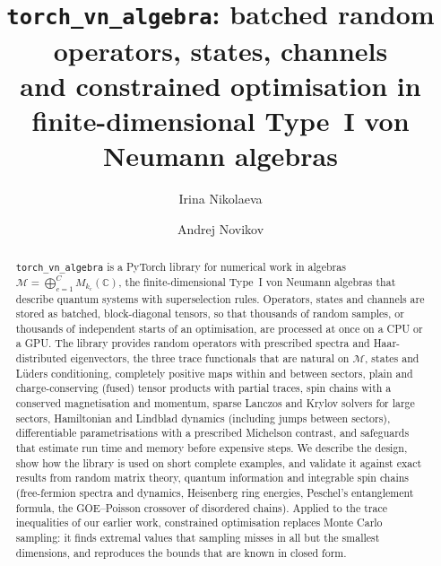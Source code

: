 \documentclass[11pt]{article}
\title{\texttt{torch\_vn\_algebra}: batched random operators, states, channels\\
and constrained optimisation in finite-dimensional Type~I von Neumann algebras}
\author{Irina Nikolaeva \and Andrej Novikov}
\date{}
\newcommand{\C}{\mathbb{C}}
\newcommand{\M}{\mathcal{M}}
\begin{document}
\maketitle

\begin{abstract}
\texttt{torch\_vn\_algebra} is a PyTorch library for numerical work in algebras
$\M=\bigoplus_{c=1}^C M_{k_c}(\C)$, the finite-dimensional Type~I von Neumann algebras that describe
quantum systems with superselection rules. Operators, states and channels are stored as batched,
block-diagonal tensors, so that thousands of random samples, or thousands of independent starts of
an optimisation, are processed at once on a CPU or a GPU. The library provides random operators with
prescribed spectra and Haar-distributed eigenvectors, the three trace functionals that are natural on
$\M$, states and Lüders conditioning, completely positive maps within and between sectors, plain and
charge-conserving (fused) tensor products with partial traces, spin chains with a conserved
magnetisation and momentum, sparse Lanczos and Krylov solvers for large sectors, Hamiltonian and
Lindblad dynamics (including jumps between sectors), differentiable parametrisations with a prescribed
Michelson contrast, and safeguards that estimate run time and memory before expensive steps. We
describe the design, show how the library is used on short complete examples, and validate it against
exact results from random matrix theory, quantum information and integrable spin chains (free-fermion
spectra and dynamics, Heisenberg ring energies, Peschel's entanglement formula, the GOE--Poisson
crossover of disordered chains). Applied to the trace inequalities of our earlier work, constrained
optimisation replaces Monte Carlo sampling: it finds extremal values that sampling misses in all but the
smallest dimensions, and reproduces the bounds that are known in closed form.
\end{abstract}
\end{document}
